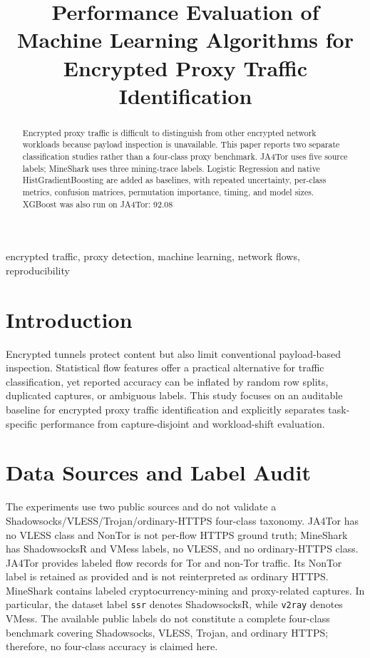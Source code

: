 \documentclass[conference]{IEEEtran}
\title{Performance Evaluation of Machine Learning Algorithms for Encrypted Proxy Traffic Identification}
\author{\IEEEauthorblockN{ZhangXiaoyuan (张校源)}\IEEEauthorblockA{Independent Researcher\\Email: silenceyuan2018@gmail.com\\ORCID: 0009-0006-6147-9256}}
\begin{document}
\sloppy
\maketitle
\begin{abstract}
Encrypted proxy traffic is difficult to distinguish from other encrypted network workloads because payload inspection is unavailable. This paper reports two separate classification studies rather than a four-class proxy benchmark. JA4Tor uses five source labels; MineShark uses three mining-trace labels. Logistic Regression and native HistGradientBoosting are added as baselines, with repeated uncertainty, per-class metrics, confusion matrices, permutation importance, timing, and model sizes. XGBoost was also run on JA4Tor: 92.08%
\end{abstract}
\begin{IEEEkeywords}
encrypted traffic, proxy detection, machine learning, network flows, reproducibility
\end{IEEEkeywords}

\section{Introduction}
Encrypted tunnels protect content but also limit conventional payload-based inspection. Statistical flow features offer a practical alternative for traffic classification, yet reported accuracy can be inflated by random row splits, duplicated captures, or ambiguous labels. This study focuses on an auditable baseline for encrypted proxy traffic identification and explicitly separates task-specific performance from capture-disjoint and workload-shift evaluation.

\section{Data Sources and Label Audit}
The experiments use two public sources and do not validate a Shadowsocks/VLESS/Trojan/ordinary-HTTPS four-class taxonomy. JA4Tor has no VLESS class and NonTor is not per-flow HTTPS ground truth; MineShark has ShadowsocksR and VMess labels, no VLESS, and no ordinary-HTTPS class. JA4Tor provides labeled flow records for Tor and non-Tor traffic. Its NonTor label is retained as provided and is not reinterpreted as ordinary HTTPS. MineShark contains labeled cryptocurrency-mining and proxy-related captures. In particular, the dataset label \texttt{ssr} denotes ShadowsocksR, while \texttt{v2ray} denotes VMess. The available public labels do not constitute a complete four-class benchmark covering Shadowsocks, VLESS, Trojan, and ordinary HTTPS; therefore, no four-class accuracy is claimed here.
\end{document}
